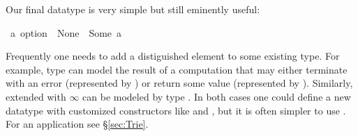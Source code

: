 %
\begin{isabellebody}%
\def\isabellecontext{Option{\isadigit{2}}}%
%
\begin{isamarkuptext}%
Our final datatype is very simple but still eminently useful:%
\end{isamarkuptext}%
\ {\isacharprime}a\ option\ {\isacharequal}\ None\ {\isacharbar}\ Some\ {\isacharprime}a%
\begin{isamarkuptext}%
\noindent
Frequently one needs to add a distiguished element to some existing type.
For example, type  can model the result of a computation that
may either terminate with an error (represented by ) or return
some value  (represented by ).
Similarly,  extended with $\infty$ can be modeled by type
. In both cases one could define a new datatype with
customized constructors like  and ,
but it is often simpler to use . For an application see
\S\ref{sec:Trie}.%
\end{isamarkuptext}%
\end{isabellebody}%
